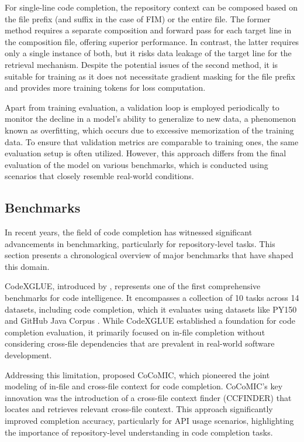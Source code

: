 For single-line code completion, the repository context can be composed based on the file prefix (and suffix in the case of FIM) or the entire file. The former method requires a separate composition and forward pass for each target line in the composition file, offering superior performance. In contrast, the latter requires only a single instance of both, but it risks data leakage of the target line for the retrieval mechanism. Despite the potential issues of the second method, it is suitable for training as it does not necessitate gradient masking for the file prefix and provides more training tokens for loss computation.

Apart from training evaluation, a validation loop is employed periodically to monitor the decline in a model's ability to generalize to new data, a phenomenon known as overfitting, which occurs due to excessive memorization of the training data. To ensure that validation metrics are comparable to training ones, the same evaluation setup is often utilized. However, this approach differs from the final evaluation of the model on various benchmarks, which is conducted using scenarios that closely resemble real-world conditions.

\subsection{Benchmarks}\label{sec:benchmarks}

In recent years, the field of code completion has witnessed significant advancements in benchmarking, particularly for repository-level tasks. This section presents a chronological overview of major benchmarks that have shaped this domain.

CodeXGLUE, introduced by \citet{lu2021}, represents one of the first comprehensive benchmarks for code intelligence. It encompasses a collection of 10 tasks across 14 datasets, including code completion, which it evaluates using datasets like PY150 \parencite{raychev2016} and GitHub Java Corpus \parencite{allamanis2013}. While CodeXGLUE established a foundation for code completion evaluation, it primarily focused on in-file completion without considering cross-file dependencies that are prevalent in real-world software development.

Addressing this limitation, \citet{ding2022} proposed CoCoMIC, which pioneered the joint modeling of in-file and cross-file context for code completion. CoCoMIC's key innovation was the introduction of a cross-file context finder (CCFINDER) that locates and retrieves relevant cross-file context. This approach significantly improved completion accuracy, particularly for API usage scenarios, highlighting the importance of repository-level understanding in code completion tasks.


